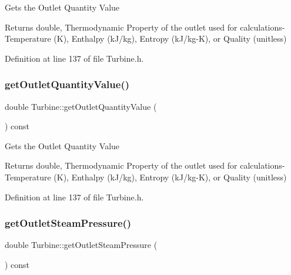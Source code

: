 Gets the Outlet Quantity Value

\begin{DoxyReturn}{Returns}
double, Thermodynamic Property of the outlet used for calculations-\/ Temperature (K), Enthalpy (k\+J/kg), Entropy (k\+J/kg-\/K), or Quality (unitless) 
\end{DoxyReturn}


Definition at line 137 of file Turbine.\+h.

\mbox{\label{class_turbine_aca98f128213e02e95dfd6f4b2ad8de4e}} 
\subsubsection{\texorpdfstring{get\+Outlet\+Quantity\+Value()}{getOutletQuantityValue()}\hspace{0.1cm}{\footnotesize\ttfamily [3/3]}}
{\footnotesize\ttfamily double Turbine\+::get\+Outlet\+Quantity\+Value (\begin{DoxyParamCaption}{ }\end{DoxyParamCaption}) const\hspace{0.3cm}{\ttfamily [inline]}}

Gets the Outlet Quantity Value

\begin{DoxyReturn}{Returns}
double, Thermodynamic Property of the outlet used for calculations-\/ Temperature (K), Enthalpy (k\+J/kg), Entropy (k\+J/kg-\/K), or Quality (unitless) 
\end{DoxyReturn}


Definition at line 137 of file Turbine.\+h.

\mbox{\label{class_turbine_a1589b2364a553db7aaa875bb543d171d}} 
\subsubsection{\texorpdfstring{get\+Outlet\+Steam\+Pressure()}{getOutletSteamPressure()}\hspace{0.1cm}{\footnotesize\ttfamily [1/3]}}
{\footnotesize\ttfamily double Turbine\+::get\+Outlet\+Steam\+Pressure (\begin{DoxyParamCaption}{ }\end{DoxyParamCaption}) const\hspace{0.3cm}{\ttfamily [inline]}}

